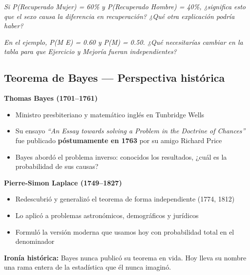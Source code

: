 \documentclass[
  letterpaper,
  DIV=11,
  numbers=noendperiod]{scrartcl}
\providecommand{\tightlist}{%
  \setlength{\itemsep}{0pt}\setlength{\parskip}{0pt}}
\begin{document}
\emph{Si P(Recuperado \textbar{} Mujer) = 60\% y P(Recuperado \textbar{}
Hombre) = 40\%, ¿significa esto que el sexo causa la diferencia en
recuperación? ¿Qué otra explicación podría haber?}

\emph{En el ejemplo, P(M \textbar{} E) = 0.60 y P(M) = 0.50. ¿Qué
necesitarías cambiar en la tabla para que Ejercicio y Mejoría fueran
independientes?}

\subsection{Teorema de Bayes --- Perspectiva
histórica}\label{teorema-de-bayes-perspectiva-historica}

\textbf{Thomas Bayes (1701--1761)}

\begin{itemize}
\tightlist
\item
  Ministro presbiteriano y matemático inglés en Tunbridge Wells
\item
  Su ensayo \emph{``An Essay towards solving a Problem in the Doctrine
  of Chances''} fue publicado \textbf{póstumamente en 1763} por su amigo
  Richard Price
\item
  Bayes abordó el problema inverso: conocidos los resultados, ¿cuál es
  la probabilidad de sus causas?
\end{itemize}

\textbf{Pierre-Simon Laplace (1749--1827)}

\begin{itemize}
\tightlist
\item
  Redescubrió y generalizó el teorema de forma independiente (1774,
  1812)
\item
  Lo aplicó a problemas astronómicos, demográficos y jurídicos
\item
  Formuló la versión moderna que usamos hoy con probabilidad total en el
  denominador
\end{itemize}

\begin{tcolorbox}[enhanced jigsaw, arc=.35mm, bottomrule=.15mm, bottomtitle=1mm, breakable, colback=white, colbacktitle=quarto-callout-note-color!10!white, colframe=quarto-callout-note-color-frame, coltitle=black, left=2mm, leftrule=.75mm, opacityback=0, opacitybacktitle=0.6, rightrule=.15mm, title=\textcolor{quarto-callout-note-color}{\faInfo}\hspace{0.5em}{Note}, titlerule=0mm, toprule=.15mm, toptitle=1mm]

\textbf{Ironía histórica:} Bayes nunca publicó su teorema en vida. Hoy
lleva su nombre una rama entera de la estadística que él nunca imaginó.

\end{tcolorbox}
\end{document}
